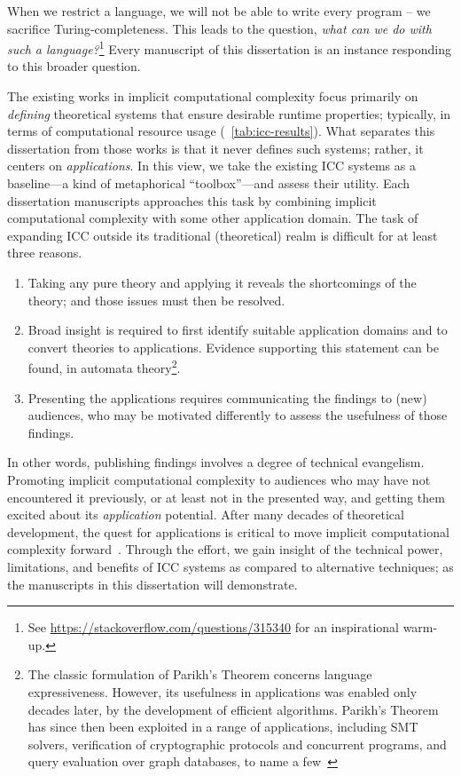 When we restrict a language, we will not be able to write every program -- \ie we sacrifice Turing-completeness.
This leads to the question, \emph{what can we do with such a language?}\footnote{
See \url{https://stackoverflow.com/questions/315340} for an inspirational warm-up.}
Every manuscript of this dissertation is an instance responding to this broader question.

The existing works in implicit computational complexity focus primarily on \emph{defining} theoretical systems that ensure desirable runtime properties;
typically, in terms of computational resource usage (\cf~\autoref{tab:icc-results}).
What separates this dissertation from those works is that it never defines such systems;
rather, it centers on \emph{applications}.
In this view, we take the existing ICC systems as a baseline---a kind of metaphorical \enquote{toolbox}---and assess their utility.
Each dissertation manuscripts approaches this task by combining implicit computational complexity with some other application domain.
The task of expanding ICC outside its traditional (theoretical) realm is difficult for at least three reasons.

\begin{enumerate}

\item Taking any pure theory and applying it reveals the shortcomings of the theory;
      and those issues must then be resolved.

\item Broad insight is required to first identify suitable application domains and to convert theories to applications.
Evidence supporting this statement can be found, \eg in automata theory\footnote{
The classic formulation of Parikh's Theorem concerns language expressiveness.
However, its usefulness in applications was enabled {only decades later}, by the development of efficient algorithms.
Parikh's Theorem has since then been exploited in a range of applications, including SMT solvers, verification of cryptographic protocols and concurrent programs, and query evaluation over graph databases, to name a few~\cite[pg. 2]{hague2024}}.

\item Presenting the applications requires communicating the findings to (new) audiences, who may be motivated differently to assess the {usefulness} of those findings.
\end{enumerate}

In other words, publishing findings involves a degree of technical evangelism.
Promoting implicit computational complexity to audiences who may have not encountered it previously, or at least not in the presented way, and getting them excited about its \emph{application} potential.
After many decades of theoretical development, the quest for applications is critical to move implicit computational complexity forward~\cite[p.~7]{moyen2017}.
Through the effort, we gain insight of the technical power, limitations, and benefits of ICC systems as compared to alternative techniques;
as the manuscripts in this dissertation will demonstrate.

